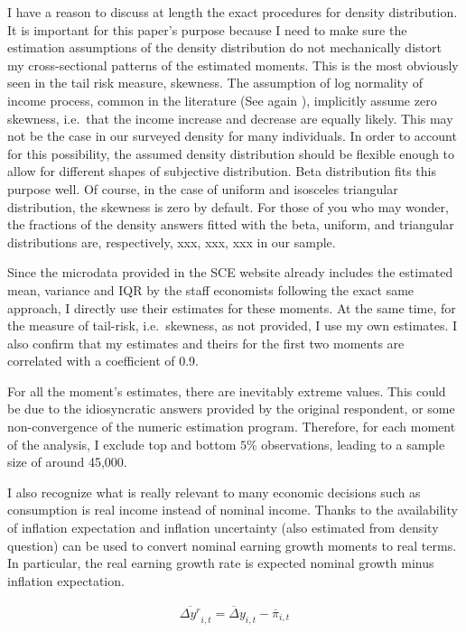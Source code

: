 \documentclass[12pt,notitlepage,onecolumn,aps,pra]{article}
\begin{document}
I have a reason to discuss at length the exact procedures for density
distribution. It is important for this paper's purpose because I need to
make sure the estimation assumptions of the density distribution do not
mechanically distort my cross-sectional patterns of the estimated
moments. This is the most obviously seen in the tail risk measure,
skewness. The assumption of log normality of income process, common in
the literature (See again \cite{blundell_consumption_2008}), implicitly
assume zero skewness, i.e.~that the income increase and decrease are
equally likely. This may not be the case in our surveyed density for
many individuals. In order to account for this possibility, the assumed
density distribution should be flexible enough to allow for different
shapes of subjective distribution. Beta distribution fits this purpose
well. Of course, in the case of uniform and isosceles triangular
distribution, the skewness is zero by default. For those of you who may
wonder, the fractions of the density answers fitted with the beta,
uniform, and triangular distributions are, respectively, xxx, xxx, xxx
in our sample.

Since the microdata provided in the SCE website already includes the
estimated mean, variance and IQR by the staff economists following the
exact same approach, I directly use their estimates for these moments.
At the same time, for the measure of tail-risk, i.e.~skewness, as not
provided, I use my own estimates. I also confirm that my estimates and
theirs for the first two moments are correlated with a coefficient of
0.9.

For all the moment's estimates, there are inevitably extreme values.
This could be due to the idiosyncratic answers provided by the original
respondent, or some non-convergence of the numeric estimation program.
Therefore, for each moment of the analysis, I exclude top and bottom
\(5\%\) observations, leading to a sample size of around 45,000.

I also recognize what is really relevant to many economic decisions such
as consumption is real income instead of nominal income. Thanks to the
availability of inflation expectation and inflation uncertainty (also
estimated from density question) can be used to convert nominal earning
growth moments to real terms. In particular, the real earning growth
rate is expected nominal growth minus inflation expectation.

\begin{eqnarray}
\overline {\Delta y^{r}}_{i,t} = \overline\Delta y_{i,t} - \overline \pi_{i,t}
\end{eqnarray}
\end{document}
